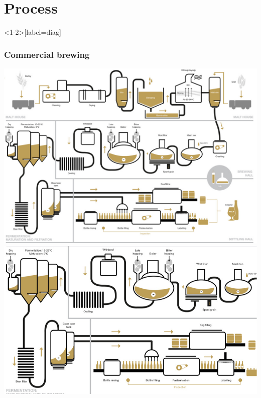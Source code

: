 \documentclass{beamer}
\begin{document}
\section{Process}
\begin{frame}<1-2>[label=diag]
  \frametitle{Commercial brewing}
  \begin{overprint}
    \includegraphics[width=\textwidth]{beerprocess.jpg}
    \includegraphics[width=\textwidth]{beerprocesszoom.png}\\
  \end{overprint}
\end{frame}
\end{document}
